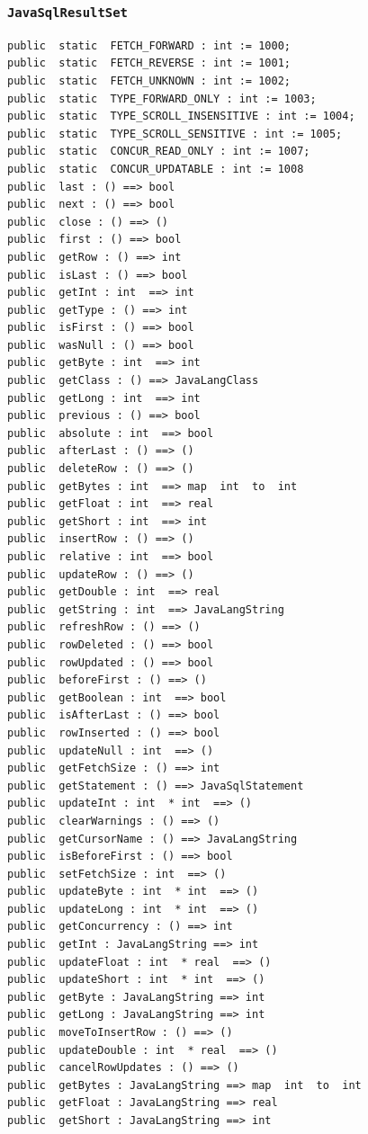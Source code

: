 \documentclass[\pformat,12pt]{article}
\begin{document}
\subsubsection{\texttt{JavaSqlResultSet}}
\begin{small}
\begin{verbatim}
public  static  FETCH_FORWARD : int := 1000;
public  static  FETCH_REVERSE : int := 1001;
public  static  FETCH_UNKNOWN : int := 1002;
public  static  TYPE_FORWARD_ONLY : int := 1003;
public  static  TYPE_SCROLL_INSENSITIVE : int := 1004;
public  static  TYPE_SCROLL_SENSITIVE : int := 1005;
public  static  CONCUR_READ_ONLY : int := 1007;
public  static  CONCUR_UPDATABLE : int := 1008
public  last : () ==> bool
public  next : () ==> bool
public  close : () ==> ()
public  first : () ==> bool
public  getRow : () ==> int
public  isLast : () ==> bool
public  getInt : int  ==> int
public  getType : () ==> int
public  isFirst : () ==> bool
public  wasNull : () ==> bool
public  getByte : int  ==> int
public  getClass : () ==> JavaLangClass
public  getLong : int  ==> int
public  previous : () ==> bool
public  absolute : int  ==> bool
public  afterLast : () ==> ()
public  deleteRow : () ==> ()
public  getBytes : int  ==> map  int  to  int
public  getFloat : int  ==> real
public  getShort : int  ==> int
public  insertRow : () ==> ()
public  relative : int  ==> bool
public  updateRow : () ==> ()
public  getDouble : int  ==> real
public  getString : int  ==> JavaLangString
public  refreshRow : () ==> ()
public  rowDeleted : () ==> bool
public  rowUpdated : () ==> bool
public  beforeFirst : () ==> ()
public  getBoolean : int  ==> bool
public  isAfterLast : () ==> bool
public  rowInserted : () ==> bool
public  updateNull : int  ==> ()
public  getFetchSize : () ==> int
public  getStatement : () ==> JavaSqlStatement
public  updateInt : int  * int  ==> ()
public  clearWarnings : () ==> ()
public  getCursorName : () ==> JavaLangString
public  isBeforeFirst : () ==> bool
public  setFetchSize : int  ==> ()
public  updateByte : int  * int  ==> ()
public  updateLong : int  * int  ==> ()
public  getConcurrency : () ==> int
public  getInt : JavaLangString ==> int
public  updateFloat : int  * real  ==> ()
public  updateShort : int  * int  ==> ()
public  getByte : JavaLangString ==> int
public  getLong : JavaLangString ==> int
public  moveToInsertRow : () ==> ()
public  updateDouble : int  * real  ==> ()
public  cancelRowUpdates : () ==> ()
public  getBytes : JavaLangString ==> map  int  to  int
public  getFloat : JavaLangString ==> real
public  getShort : JavaLangString ==> int

\end{verbatim}
\end{small}
\end{document}
